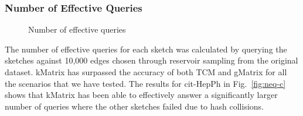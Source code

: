 \subsubsection{Number of Effective Queries}

\begin{figure}[htbp] 
    \centering
    \hfill
    \hfill
    \caption{Number of effective queries}
    \label{fig:edgq-queries-neq-test}
\end{figure}

The number of effective queries for each sketch was calculated by querying the sketches against 10,000 edges chosen through reservoir sampling from the original dataset. kMatrix has surpassed the accuracy of both TCM and gMatrix for all the scenarios that we have tested. The results for cit-HepPh in Fig.~\ref{fig:neq-c} shows that kMatrix has been able to effectively answer a significantly larger number of queries where the other sketches failed due to hash collisions.  